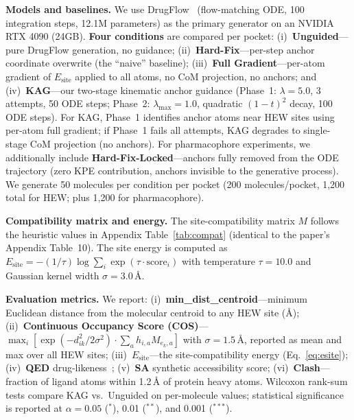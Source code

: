 \documentclass{article}
\begin{document}
\textbf{Models and baselines.}
We use DrugFlow~\cite{drugflow2024} (flow-matching ODE, 100 integration steps,
12.1M parameters) as the primary generator on an NVIDIA RTX 4090 (24GB).
\textbf{Four conditions} are compared per pocket:
(i)~\textbf{Unguided}---pure DrugFlow generation, no guidance;
(ii)~\textbf{Hard-Fix}---per-step anchor coordinate overwrite (the
``naive'' baseline);
(iii)~\textbf{Full Gradient}---per-atom gradient of $E_{\text{site}}$
applied to all atoms, no CoM projection, no anchors;
and (iv)~\textbf{KAG}---our two-stage kinematic anchor guidance
(Phase~1: $\lambda=5.0$, 3 attempts, 50 ODE steps; Phase~2:
$\lambda_{\max}=1.0$, quadratic $(1-t)^2$ decay, 100 ODE steps).
For KAG, Phase~1 identifies anchor atoms near HEW sites using per-atom
full gradient; if Phase~1 fails all attempts, KAG degrades to
single-stage CoM projection (no anchors).
For pharmacophore experiments, we additionally include
\textbf{Hard-Fix-Locked}---anchors fully removed from the ODE trajectory
(zero KPE contribution, anchors invisible to the generative process).
We generate 50 molecules per condition per pocket (200 molecules/pocket,
1,200 total for HEW; plus 1,200 for pharmacophore).

\textbf{Compatibility matrix and energy.}
The site-compatibility matrix $M$ follows the heuristic values in
Appendix Table~\ref{tab:compat} (identical to the paper's Appendix
Table~10).  The site energy is computed as $E_{\text{site}} =
-(1/\tau) \log \sum_i \exp(\tau \cdot \text{score}_i)$ with
temperature $\tau=10.0$ and Gaussian kernel width $\sigma=3.0$\,\AA{}.

\textbf{Evaluation metrics.}
We report:
(i)~\textbf{min\_dist\_centroid}---minimum Euclidean distance from the
molecular centroid to any HEW site (\AA{});
(ii)~\textbf{Continuous Occupancy Score (COS)}---$\max_i[\exp(-d_{ik}^2/2\sigma^2)
\cdot \sum_a h_{i,a} M_{e_k,a}]$ with $\sigma=1.5$\,\AA{}, reported as
mean and max over all HEW sites;
(iii)~\textbf{$E_{\text{site}}$}---the site-compatibility energy
(Eq.~\ref{eq:esite});
(iv)~\textbf{QED} drug-likeness~\cite{bickerton2012qed};
(v)~\textbf{SA} synthetic accessibility score;
(vi)~\textbf{Clash}---fraction of ligand atoms within 1.2\,\AA{} of
protein heavy atoms.
Wilcoxon rank-sum tests compare KAG vs.\ Unguided on per-molecule
values; statistical significance is reported at
$\alpha=0.05$ ($^*$), 0.01 ($^{**}$), and 0.001 ($^{***}$).
\end{document}
